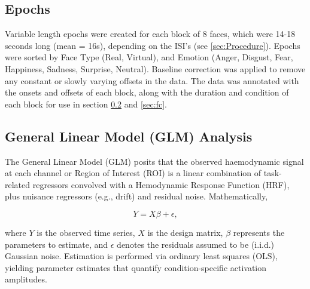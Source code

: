 \subsection{Epochs}
Variable length epochs were created for each block of 8 faces, which were 14-18 seconds long (mean = 16s), depending on the ISI's (see \ref{sec:Procedure}).
Epochs were sorted by Face Type (Real, Virtual), and Emotion (Anger, Disgust, Fear, Happiness, Sadness, Surprise, Neutral). 
Baseline correction was applied to remove any constant or slowly varying offsets in the data. 
The data was annotated with the onsets and offsets of each block, along with the duration and condition of each block for use in section \ref{sec:GLM} and \ref{sec:fc}.

\subsection{General Linear Model (GLM) Analysis}
\label{sec:GLM}
The General Linear Model (GLM) posits that the observed haemodynamic signal at each channel or Region of Interest (ROI) is a linear combination of task-related regressors convolved with a Hemodynamic Response Function (HRF), plus nuisance regressors (e.g., drift) and residual noise. Mathematically, 

\begin{equation}
Y = X\beta + \epsilon,
\end{equation}

where \( Y \) is the observed time series, \( X \) is the design matrix, \( \beta \) represents the parameters to estimate, and \( \epsilon \) denotes the residuals assumed to be (i.i.d.) Gaussian noise.
Estimation is performed via ordinary least squares (OLS), yielding parameter estimates that quantify condition-specific activation amplitudes.

